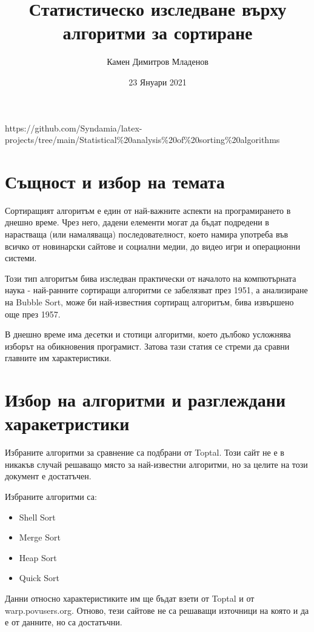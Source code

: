 \documentclass[12pt,a4paper]{article}
\title{Статистическо изследване върху алгоритми за сортиране}
\author{Камен Димитров Младенов}
\date{23 Януари 2021}
\begin{document}
\maketitle
\begin{center}
{\fontsize{10pt}{4}\selectfont https://github.com/Syndamia/latex-projects/tree/main/Statistical\%20analysis\%20of\%20sorting\%20algorithms}
\end{center}
\tableofcontents

\newpage

\section{Същност и избор на темата}

Сортиращият алгоритъм е един от най-важните аспекти на програмирането в днешно време. 
Чрез него, дадени елементи могат да бъдат подредени в нарастваща (или намаляваща) последователност, което намира употреба във всичко от новинарски сайтове и социални медии, до видео игри и операционни системи.

Този тип алгоритъм бива изследван практически от началото на компютърната наука - най-ранните сортиращи алгоритми се забелязват през 1951, а анализиране на Bubble Sort, може би най-известния сортиращ алгоритъм, бива извършено още през 1957.\cite{wikipedia_sorting_algorithm_history}

В днешно време има десетки и стотици алгоритми, което дълбоко усложнява изборът на обикновения програмист. 
Затова тази статия се стреми да сравни главните им характеристики.

\section{Избор на алгоритми и разглеждани харакетристики}

Избраните алгоритми за сравнение са подбрани от Toptal\cite{toptal}. Този сайт не е в никакъв случай решаващо място за най-известни алгоритми, но за целите на този документ е достатъчен. 

Избраните алгоритми са:

\begin{itemize}
\item Shell Sort
\item Merge Sort
\item Heap Sort
\item Quick Sort
\end{itemize}

Данни относно характеристиките им ще бъдат взети от Toptal\cite{toptal} и от warp.povusers.org\cite{comparing_algorithms}. Отново, тези сайтове не са решаващи източници на която и да е от данните, но са достатъчни. 
\end{document}

